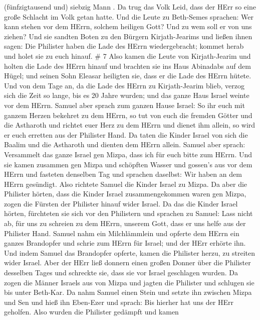(fünfzigtausend und) siebzig Mann . Da trug das Volk Leid, dass der HErr
so eine große Schlacht im Volk getan hatte.  Und die Leute
zu Beth-Semes sprachen: Wer kann stehen vor dem HErrn, solchem heiligen
Gott? Und zu wem soll er von uns ziehen?  Und sie sandten
Boten zu den Bürgern Kirjath-Jearims und ließen ihnen sagen: Die
Philister haben die Lade des HErrn wiedergebracht; kommet herab und
holet sie zu euch hinauf. \# 7  Also kamen die Leute von
Kirjath-Jearim und holten die Lade des HErrn hinauf und brachten sie ins
Haus Abinadabs auf dem Hügel; und seinen Sohn Eleasar heiligten sie,
dass er die Lade des HErrn hütete.  Und von dem Tage an, da
die Lade des HErrn zu Kirjath-Jearim blieb, verzog sich die Zeit so
lange, bis es 20 Jahre wurden; und das ganze Haus Israel weinte vor dem
HErrn.  Samuel aber sprach zum ganzen Hause Israel: So ihr
euch mit ganzem Herzen bekehret zu dem HErrn, so tut von euch die
fremden Götter und die Astharoth und richtet euer Herz zu dem HErrn und
dienet ihm allein, so wird er euch erretten aus der Philister Hand.
 Da taten die Kinder Israel von sich die Baalim und die
Astharoth und dienten dem HErrn allein.  Samuel aber sprach:
Versammelt das ganze Israel gen Mizpa, dass ich für euch bitte zum
HErrn.  Und sie kamen zusammen gen Mizpa und schöpften
Wasser und gossen's aus vor dem HErrn und fasteten denselben Tag und
sprachen daselbst: Wir haben an dem HErrn gesündigt. Also richtete
Samuel die Kinder Israel zu Mizpa.  Da aber die Philister
hörten, dass die Kinder Israel zusammengekommen waren gen Mizpa, zogen
die Fürsten der Philister hinauf wider Israel. Da das die Kinder Israel
hörten, fürchteten sie sich vor den Philistern  und sprachen
zu Samuel: Lass nicht ab, für uns zu schreien zu dem HErrn, unserem
Gott, dass er uns helfe aus der Philister Hand.  Samuel nahm
ein Milchlämmlein und opferte dem HErrn ein ganzes Brandopfer und schrie
zum HErrn für Israel; und der HErr erhörte ihn.  Und indem
Samuel das Brandopfer opferte, kamen die Philister herzu, zu streiten
wider Israel. Aber der HErr ließ donnern einen großen Donner über die
Philister desselben Tages und schreckte sie, dass sie vor Israel
geschlagen wurden.  Da zogen die Männer Israels aus von
Mizpa und jagten die Philister und schlugen sie bis unter Beth-Kar.
 Da nahm Samuel einen Stein und setzte ihn zwischen Mizpa
und Sen und hieß ihn Eben-Ezer und sprach: Bis hierher hat uns der HErr
geholfen.  Also wurden die Philister gedämpft und kamen
